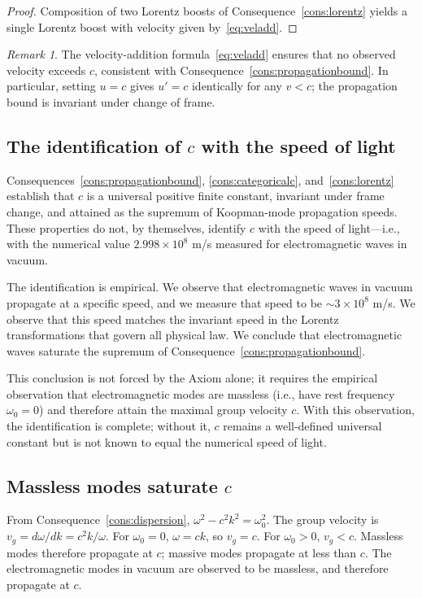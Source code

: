 \documentclass[11pt,twocolumn,a4paper]{article}
\theoremstyle{axiomstyle}
\theoremstyle{conseqstyle}
\theoremstyle{definition}
\theoremstyle{remark}
\newtheorem*{remark}{Remark}
\begin{document}
\begin{proof}
Composition of two Lorentz boosts of Consequence~\ref{cons:lorentz} yields a single Lorentz boost with velocity given by~\eqref{eq:veladd}.
\end{proof}

\begin{remark}
The velocity-addition formula~\eqref{eq:veladd} ensures that no observed velocity exceeds $c$, consistent with Consequence~\ref{cons:propagationbound}. In particular, setting $u=c$ gives $u'=c$ identically for any $v<c$; the propagation bound is invariant under change of frame.
\end{remark}

\subsection{The identification of $c$ with the speed of light}

Consequences~\ref{cons:propagationbound}, \ref{cons:categoricalc}, and~\ref{cons:lorentz} establish that $c$ is a universal positive finite constant, invariant under frame change, and attained as the supremum of Koopman-mode propagation speeds. These properties do not, by themselves, identify $c$ with the speed of light---i.e., with the numerical value $2.998\times 10^{8}$ m/s measured for electromagnetic waves in vacuum.

The identification is empirical. We observe that electromagnetic waves in vacuum propagate at a specific speed, and we measure that speed to be $\sim 3\times 10^{8}$ m/s. We observe that this speed matches the invariant speed in the Lorentz transformations that govern all physical law. We conclude that electromagnetic waves saturate the supremum of Consequence~\ref{cons:propagationbound}.

This conclusion is not forced by the Axiom alone; it requires the empirical observation that electromagnetic modes are massless (i.e., have rest frequency $\omega_{0}=0$) and therefore attain the maximal group velocity $c$. With this observation, the identification is complete; without it, $c$ remains a well-defined universal constant but is not known to equal the numerical speed of light.

\subsection{Massless modes saturate $c$}

From Consequence~\ref{cons:dispersion}, $\omega^{2}-c^{2}k^{2}=\omega_{0}^{2}$. The group velocity is $v_{g}=d\omega/dk=c^{2}k/\omega$. For $\omega_{0}=0$, $\omega=ck$, so $v_{g}=c$. For $\omega_{0}>0$, $v_{g}<c$. Massless modes therefore propagate at $c$; massive modes propagate at less than $c$. The electromagnetic modes in vacuum are observed to be massless, and therefore propagate at $c$.
\end{document}
